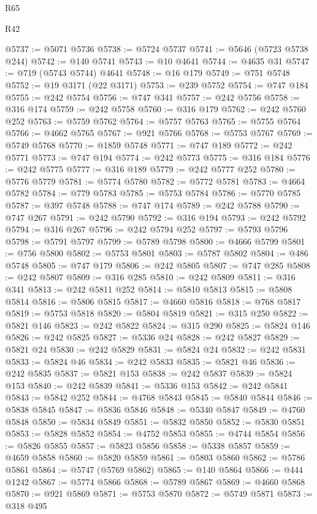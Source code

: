 \begin{lexlean}{R65}
\begin{lexlean}{R42}
\begin{coremodule}
{{{{{{{{{{{{{{{{{{{{{{{{{{{{{{{{{{{{{{{{{{{{{{{{{{{{{{{{{{{{{{{{{{{{{{{{{{{{{{{{{{{{{{{{{{{{{{{{{{{{{{{{{{{{{{{{{{{{{{{{{{{{{{{{{{{{{{{{{{{{{{{{{{{{{{{{{{{{{{{{{{{{{{{{{{{{{{{{{{{{{{{{@5737 := @5071 @5736
@5738 := @5724 @5737
@5741 := @5646 (@5723 @5738 @244)
@5742 := @140 @5741
@5743 := @10 @4641
@5744 := @4635 @31
@5747 := @719 (@5743 @5744) @4641
@5748 := @16 @179
@5749 := @751 @5748
@5752 := @19 @3171 (@22 @3171)
@5753 := @239 @5752
@5754 := @747 @184
@5755 := @242 @5754
@5756 := @747 @341
@5757 := @242 @5756
@5758 := @316 @174
@5759 := @242 @5758
@5760 := @316 @179
@5762 := @242 @5760 @252
@5763 := @5759 @5762
@5764 := @5757 @5763
@5765 := @5755 @5764
@5766 := @4662 @5765
@5767 := @921 @5766
@5768 := @5753 @5767
@5769 := @5749 @5768
@5770 := @1859 @5748
@5771 := @747 @189
@5772 := @242 @5771
@5773 := @747 @194
@5774 := @242 @5773
@5775 := @316 @184
@5776 := @242 @5775
@5777 := @316 @189
@5779 := @242 @5777 @252
@5780 := @5776 @5779
@5781 := @5774 @5780
@5782 := @5772 @5781
@5783 := @4664 @5782
@5784 := @779 @5783
@5785 := @5753 @5784
@5786 := @5770 @5785
@5787 := @397 @5748
@5788 := @747 @174
@5789 := @242 @5788
@5790 := @747 @267
@5791 := @242 @5790
@5792 := @316 @194
@5793 := @242 @5792
@5794 := @316 @267
@5796 := @242 @5794 @252
@5797 := @5793 @5796
@5798 := @5791 @5797
@5799 := @5789 @5798
@5800 := @4666 @5799
@5801 := @756 @5800
@5802 := @5753 @5801
@5803 := @5787 @5802
@5804 := @486 @5748
@5805 := @747 @179
@5806 := @242 @5805
@5807 := @747 @285
@5808 := @242 @5807
@5809 := @316 @285
@5810 := @242 @5809
@5811 := @316 @341
@5813 := @242 @5811 @252
@5814 := @5810 @5813
@5815 := @5808 @5814
@5816 := @5806 @5815
@5817 := @4660 @5816
@5818 := @768 @5817
@5819 := @5753 @5818
@5820 := @5804 @5819
@5821 := @315 @250
@5822 := @5821 @146
@5823 := @242 @5822
@5824 := @315 @290
@5825 := @5824 @146
@5826 := @242 @5825
@5827 := @5336 @24
@5828 := @242 @5827
@5829 := @5821 @24
@5830 := @242 @5829
@5831 := @5824 @24
@5832 := @242 @5831
@5833 := @5824 @46
@5834 := @242 @5833
@5835 := @5821 @46
@5836 := @242 @5835
@5837 := @5821 @153
@5838 := @242 @5837
@5839 := @5824 @153
@5840 := @242 @5839
@5841 := @5336 @153
@5842 := @242 @5841
@5843 := @5842 @252
@5844 := @4768 @5843
@5845 := @5840 @5844
@5846 := @5838 @5845
@5847 := @5836 @5846
@5848 := @5340 @5847
@5849 := @4760 @5848
@5850 := @5834 @5849
@5851 := @5832 @5850
@5852 := @5830 @5851
@5853 := @5828 @5852
@5854 := @4752 @5853
@5855 := @4744 @5854
@5856 := @5826 @5855
@5857 := @5823 @5856
@5858 := @5338 @5857
@5859 := @4659 @5858
@5860 := @5820 @5859
@5861 := @5803 @5860
@5862 := @5786 @5861
@5864 := @5747 (@5769 @5862)
@5865 := @140 @5864
@5866 := @444 @1242
@5867 := @5774 @5866
@5868 := @5789 @5867
@5869 := @4660 @5868
@5870 := @921 @5869
@5871 := @5753 @5870
@5872 := @5749 @5871
@5873 := @318 @495
}}}}}}}}}}}}}}}}}}}}}}}}}}}}}}}}}}}}}}}}}}}}}}}}}}}}}}}}}}}}}}}}}}}}}}}}}}}}}}}}}}}}}}}}}}}}}}}}}}}}}}}}}}}}}}}}}}}}}}}}}}}}}}}}}}}}}}}}}}}}}}}}}}}}}}}}}}}}}}}}}}}}}}}}}}}}}}}}}}}}}}}}
\end{coremodule}
\end{lexlean}
\end{lexlean}
